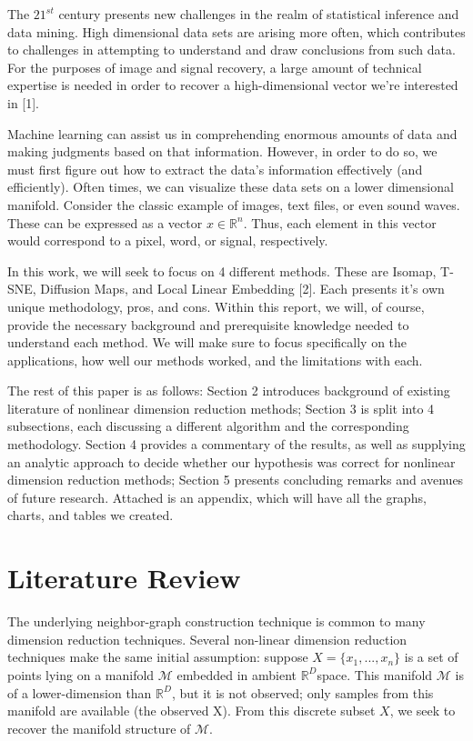 \documentclass[12pt]{article}
\begin{document}
\hspace{5mm}The $21^{st}$ century presents new challenges in the realm of statistical inference and data mining. High dimensional data sets are arising more often, which contributes to challenges in attempting to understand and draw conclusions from such data. For the purposes of image and signal recovery, a large amount of technical expertise is needed in order to recover a high-dimensional vector we're interested in [1].

Machine learning can assist us in comprehending enormous amounts of data and making judgments based on that information. However, in order to do so, we must first figure out how to extract the data's information effectively (and efficiently). Often times, we can visualize these data sets on a lower dimensional manifold. Consider the classic example of images, text files, or even sound waves. These can be expressed as a vector $x\in\mathbb{R}^n$. Thus, each element in this vector would correspond to a pixel, word, or signal, respectively.

In this work, we will seek to focus on 4 different methods. These are Isomap, T-SNE, Diffusion Maps, and Local Linear Embedding [2]. Each presents it's own unique methodology, pros, and cons. Within this report, we will, of course, provide the necessary background and prerequisite knowledge needed to understand each method. We will make sure to focus specifically on the applications, how well our methods worked, and the limitations with each. 

The rest of this paper is as follows: Section 2 introduces background of existing literature of nonlinear dimension reduction methods; Section 3 is split into 4 subsections, each discussing a different algorithm and the corresponding methodology. Section 4 provides a commentary of the results, as well as supplying an analytic approach to decide whether our hypothesis was correct for nonlinear dimension reduction methods; Section 5 presents concluding remarks and avenues of future research. Attached is an appendix, which will have all the graphs, charts, and tables we created.


\section{Literature Review}
\hspace{5mm}
The underlying neighbor-graph construction technique is common to many dimension reduction techniques.
Several non-linear dimension reduction techniques make the same initial assumption: suppose $X =\{x_1,..., x_n\}$ is a set of points lying on a manifold $\mathcal{M}$ embedded in ambient $\mathbb{R}^D$space. This manifold $\mathcal{M}$ is of a lower-dimension than $\mathbb{R}^D$, but it is not observed; only samples from this manifold are available (the observed X). From this discrete subset $X$, we seek to recover the manifold structure of $\mathcal{M}$.
\end{document}
